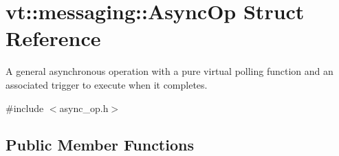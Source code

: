 \hypertarget{structvt_1_1messaging_1_1_async_op}{}\section{vt\+:\+:messaging\+:\+:Async\+Op Struct Reference}
\label{structvt_1_1messaging_1_1_async_op}


A general asynchronous operation with a pure virtual polling function and an associated trigger to execute when it completes.  




{\ttfamily \#include $<$async\+\_\+op.\+h$>$}

\subsection*{Public Member Functions}
